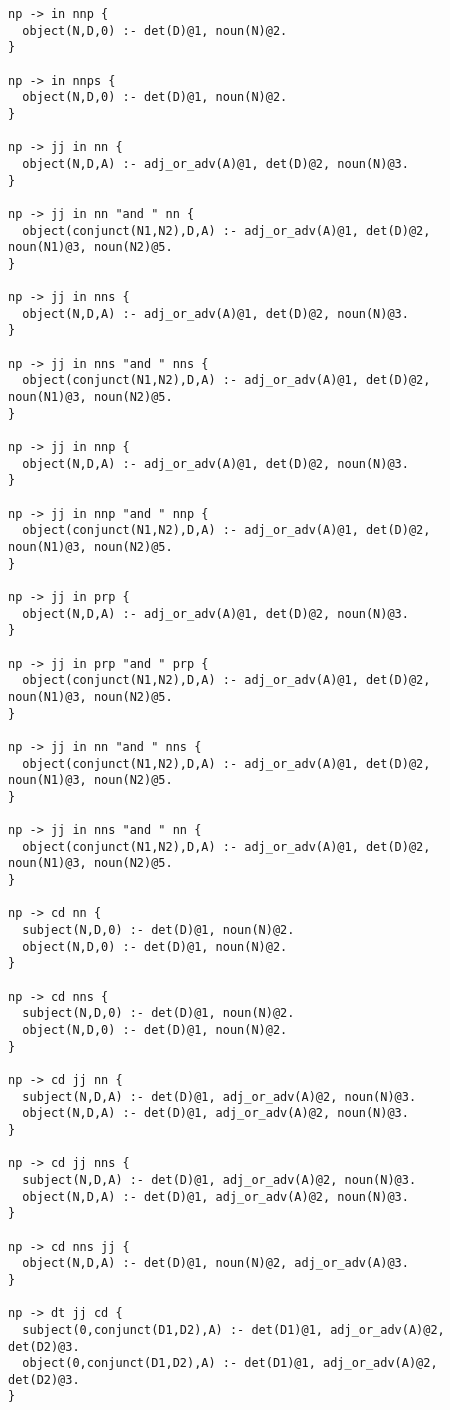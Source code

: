 \begin{lstlisting}
np -> in nnp {
  object(N,D,0) :- det(D)@1, noun(N)@2.
}

np -> in nnps {
  object(N,D,0) :- det(D)@1, noun(N)@2.
}

np -> jj in nn {
  object(N,D,A) :- adj_or_adv(A)@1, det(D)@2, noun(N)@3.
}

np -> jj in nn "and " nn {
  object(conjunct(N1,N2),D,A) :- adj_or_adv(A)@1, det(D)@2, noun(N1)@3, noun(N2)@5.
}

np -> jj in nns {
  object(N,D,A) :- adj_or_adv(A)@1, det(D)@2, noun(N)@3.
}

np -> jj in nns "and " nns {
  object(conjunct(N1,N2),D,A) :- adj_or_adv(A)@1, det(D)@2, noun(N1)@3, noun(N2)@5.
}

np -> jj in nnp {
  object(N,D,A) :- adj_or_adv(A)@1, det(D)@2, noun(N)@3.
}

np -> jj in nnp "and " nnp {
  object(conjunct(N1,N2),D,A) :- adj_or_adv(A)@1, det(D)@2, noun(N1)@3, noun(N2)@5.
}

np -> jj in prp {
  object(N,D,A) :- adj_or_adv(A)@1, det(D)@2, noun(N)@3.
}

np -> jj in prp "and " prp {
  object(conjunct(N1,N2),D,A) :- adj_or_adv(A)@1, det(D)@2, noun(N1)@3, noun(N2)@5.
}

np -> jj in nn "and " nns {
  object(conjunct(N1,N2),D,A) :- adj_or_adv(A)@1, det(D)@2, noun(N1)@3, noun(N2)@5.
}

np -> jj in nns "and " nn {
  object(conjunct(N1,N2),D,A) :- adj_or_adv(A)@1, det(D)@2, noun(N1)@3, noun(N2)@5.
}

np -> cd nn {
  subject(N,D,0) :- det(D)@1, noun(N)@2.
  object(N,D,0) :- det(D)@1, noun(N)@2.
}

np -> cd nns {
  subject(N,D,0) :- det(D)@1, noun(N)@2.
  object(N,D,0) :- det(D)@1, noun(N)@2.
}

np -> cd jj nn {
  subject(N,D,A) :- det(D)@1, adj_or_adv(A)@2, noun(N)@3.
  object(N,D,A) :- det(D)@1, adj_or_adv(A)@2, noun(N)@3.
}

np -> cd jj nns {
  subject(N,D,A) :- det(D)@1, adj_or_adv(A)@2, noun(N)@3.
  object(N,D,A) :- det(D)@1, adj_or_adv(A)@2, noun(N)@3.
}

np -> cd nns jj {
  object(N,D,A) :- det(D)@1, noun(N)@2, adj_or_adv(A)@3.
}

np -> dt jj cd {
  subject(0,conjunct(D1,D2),A) :- det(D1)@1, adj_or_adv(A)@2, det(D2)@3.
  object(0,conjunct(D1,D2),A) :- det(D1)@1, adj_or_adv(A)@2, det(D2)@3.
}
\end{lstlisting}

